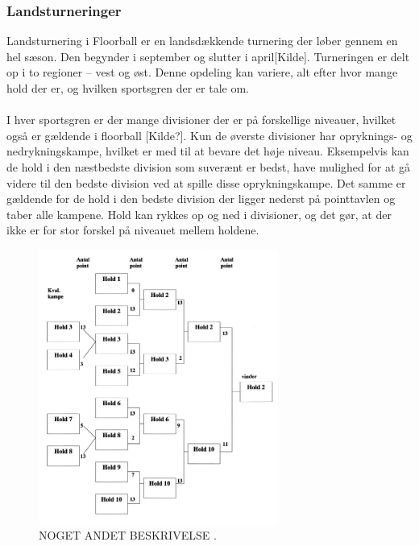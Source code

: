 \subsubsection{Landsturneringer}
Landsturnering i Floorball er en landsdækkende turnering der løber gennem en hel sæson. Den begynder i september og slutter i april[Kilde]. Turneringen er delt op i to regioner – vest og øst. Denne opdeling kan variere, alt efter hvor mange hold der er, og hvilken sportsgren der er tale om. 
\\\\
I hver sportsgren er der mange divisioner der er på forskellige niveauer, hvilket også er gældende i floorball [Kilde?]. Kun de øverste divisioner har opryknings- og nedrykningskampe, hvilket er med til at bevare det høje niveau. Eksempelvis kan de hold i den næstbedste division som suverænt er bedst, have mulighed for at gå videre til den bedste division ved at spille disse oprykningskampe. Det samme er gældende for de hold i den bedste division der ligger nederst på pointtavlen og taber alle kampene. Hold kan rykkes op og ned i divisioner, og det gør, at der ikke er for stor forskel på niveauet mellem holdene.
\\
\begin{figure}[H]
  \centering
  \includegraphics[width=0.7\textwidth]{figures/cup-spil.png}
  \caption{NOGET ANDET BESKRIVELSE 
  \citep{REFERENCE}.}
  \label{fig:test}
\end{figure}

